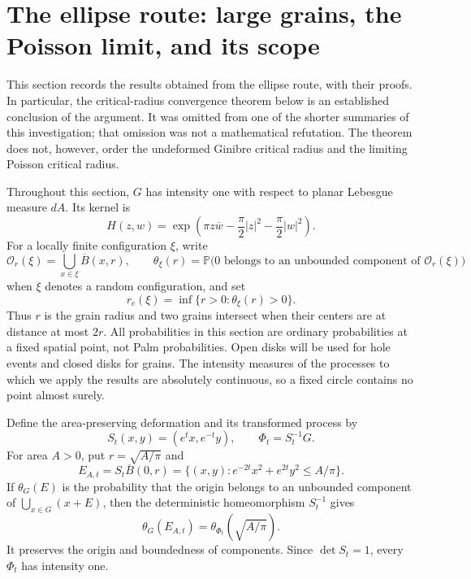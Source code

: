 \documentclass[11pt,a4paper]{article}
\theoremstyle{definition}
\theoremstyle{remark}
\numberwithin{equation}{section}
\begin{document}

\setcounter{theorem}{6}

\section{The ellipse route: large grains, the Poisson limit, and its scope}
\label{ell:section}

This section records the results obtained from the ellipse route, with
their proofs.  In particular, the critical-radius convergence theorem
below is an established conclusion of the argument.  It was omitted
from one of the shorter summaries of this investigation; that omission
was not a mathematical refutation.  The theorem does not, however,
order the undeformed Ginibre critical radius and the limiting Poisson
critical radius.

Throughout this section, $G$ has intensity one with respect to planar
Lebesgue measure $dA$.  Its kernel is
\begin{equation}\label{ell:ginibre-kernel}
 H(z,w)=\exp\left(\pi z\overline w
       -\frac\pi2|z|^2-\frac\pi2|w|^2\right).
\end{equation}
For a locally finite configuration $\xi$, write
\[
 \mathcal O_r(\xi)=\bigcup_{x\in\xi}\overline B(x,r),
 \qquad
 \theta_\xi(r)=\mathbb P\bigl(0\text{ belongs to an unbounded
 component of }\mathcal O_r(\xi)\bigr)
\]
when $\xi$ denotes a random configuration, and set
\[
 r_c(\xi)=\inf\{r>0:\theta_\xi(r)>0\}.
\]
Thus $r$ is the grain radius and two grains intersect when their
centers are at distance at most $2r$.  All probabilities in this
section are ordinary probabilities at a fixed spatial point, not Palm
probabilities.  Open disks will be used for hole events and closed
disks for grains.  The intensity measures of the processes to which
we apply the results are absolutely continuous, so a fixed circle
contains no point almost surely.

Define the area-preserving deformation and its transformed process by
\begin{equation}\label{ell:deformation}
 S_t(x,y)=(e^t x,e^{-t}y),\qquad \Phi_t=S_t^{-1}G.
\end{equation}
For area $A>0$, put $r=\sqrt{A/\pi}$ and
\begin{equation}\label{ell:ellipse}
 E_{A,t}=S_t\overline B(0,r)
 =\{(x,y):e^{-2t}x^2+e^{2t}y^2\le A/\pi\}.
\end{equation}
If $\theta_G(E)$ is the probability that the origin belongs to an
unbounded component of $\bigcup_{x\in G}(x+E)$, then the deterministic
homeomorphism $S_t^{-1}$ gives
\begin{equation}\label{ell:affine-equivalence}
 \theta_G(E_{A,t})=\theta_{\Phi_t}(\sqrt{A/\pi}).
\end{equation}
It preserves the origin and boundedness of components.  Since
$\det S_t=1$, every $\Phi_t$ has intensity one.
\end{document}
